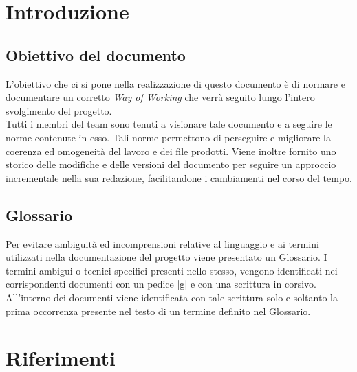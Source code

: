 \documentclass[10pt, a4paper]{article}
\title{\titolo}
\author{SWEetCode}
\begin{document}



\newpage

\tableofcontents
\newpage

\section{Introduzione}
\subsection{Obiettivo del documento}
L'obiettivo che ci si pone nella realizzazione di questo documento è di normare e documentare un corretto \textit{Way of Working\pg} che verrà seguito lungo l'intero svolgimento del progetto.\\
Tutti i membri del team sono tenuti a visionare tale documento e a seguire le norme contenute in esso. Tali norme permettono di perseguire e migliorare la coerenza ed omogeneità del lavoro e dei file prodotti.
Viene inoltre fornito uno storico delle modifiche e delle versioni del documento per seguire un approccio incrementale nella sua redazione, facilitandone i cambiamenti nel corso del tempo.

\subsection{Glossario}
Per evitare ambiguità ed incomprensioni relative al linguaggio e ai termini utilizzati nella documentazione del progetto viene presentato un Glossario.
I termini ambigui o tecnici-specifici presenti nello stesso, vengono identificati nei corrispondenti documenti con un pedice |g| e con una scrittura in corsivo.
All'interno dei documenti viene identificata con tale scrittura solo e soltanto la prima occorrenza presente nel testo di un termine definito nel Glossario.

\section{Riferimenti}
\end{document}
